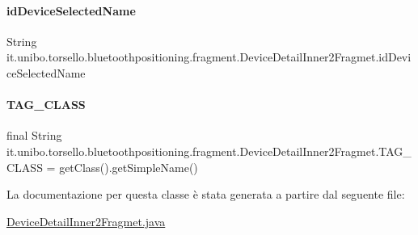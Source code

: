 \paragraph{\texorpdfstring{id\+Device\+Selected\+Name}{idDeviceSelectedName}}
{\footnotesize\ttfamily String it.\+unibo.\+torsello.\+bluetoothpositioning.\+fragment.\+Device\+Detail\+Inner2\+Fragmet.\+id\+Device\+Selected\+Name\hspace{0.3cm}{\ttfamily [private]}}

\hypertarget{classit_1_1unibo_1_1torsello_1_1bluetoothpositioning_1_1fragment_1_1DeviceDetailInner2Fragmet_acd1f1a0a435e383240ad0222c4eb7972_acd1f1a0a435e383240ad0222c4eb7972}{}\label{classit_1_1unibo_1_1torsello_1_1bluetoothpositioning_1_1fragment_1_1DeviceDetailInner2Fragmet_acd1f1a0a435e383240ad0222c4eb7972_acd1f1a0a435e383240ad0222c4eb7972} 
\paragraph{\texorpdfstring{T\+A\+G\+\_\+\+C\+L\+A\+SS}{TAG\_CLASS}}
{\footnotesize\ttfamily final String it.\+unibo.\+torsello.\+bluetoothpositioning.\+fragment.\+Device\+Detail\+Inner2\+Fragmet.\+T\+A\+G\+\_\+\+C\+L\+A\+SS = get\+Class().get\+Simple\+Name()\hspace{0.3cm}{\ttfamily [private]}}



La documentazione per questa classe è stata generata a partire dal seguente file\+:\begin{DoxyCompactItemize}
\item 
\hyperlink{DeviceDetailInner2Fragmet_8java}{Device\+Detail\+Inner2\+Fragmet.\+java}\end{DoxyCompactItemize}
